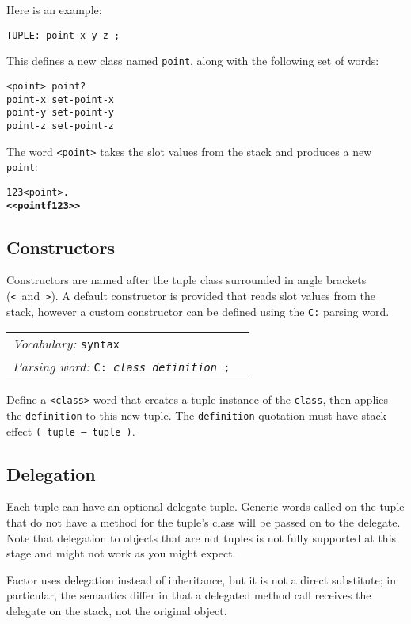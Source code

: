 \documentclass{book}
\newcommand{\vocabulary}[1]{\emph{Vocabulary:} \texttt{#1}&\\}
\newcommand{\parsingword}[2]{\index{\texttt{#1}}\emph{Parsing word:} \texttt{#2}&\\}
\newcommand{\wordtable}[1]{


\begin{tabularx}{12cm}{lX}
\hline
#1
\hline
\end{tabularx}

}
\begin{document}
Here is an example:
\begin{verbatim}
TUPLE: point x y z ;
\end{verbatim}
This defines a new class named \texttt{point}, along with the
following set of words:
\begin{verbatim}
<point> point?
point-x set-point-x
point-y set-point-y
point-z set-point-z
\end{verbatim}
The word \texttt{<point>} takes the slot values from the stack and
produces a new \texttt{point}:
\begin{alltt}
  1 2 3 <point> .
\textbf{<< point f 1 2 3 >>}
\end{alltt}

\subsection{Constructors}

Constructors are named after the tuple class surrounded in angle
brackets (\texttt{<}~and~\texttt{>}). A default constructor is provided
that reads slot values from the stack, however a custom constructor can
be defined using the \texttt{C:} parsing word.
\wordtable{
\vocabulary{syntax}
\parsingword{C:}{C: \emph{class} \emph{definition} ;}
}
Define a \texttt{<class>} word that creates a tuple instance of the \texttt{class}, then applies the \texttt{definition} to this new tuple. The \texttt{definition} quotation must have stack effect \texttt{( tuple -- tuple )}.

\subsection{Delegation}


Each tuple can have an optional delegate tuple. Generic words called on
the tuple that do not have a method for the tuple's class will be passed on
to the delegate. Note that delegation to objects that are not tuples is not fully supported at this stage and might not work as you might expect.

Factor uses delegation instead of inheritance, but it is not a direct
substitute; in particular, the semantics differ in that a delegated
method call receives the delegate on the stack, not the original object.
\end{document}
